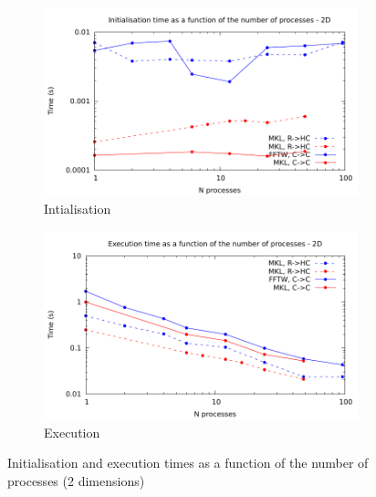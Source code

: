\documentclass[12pt, a4paper]{article}
\begin{document}
\begin{figure}[H]
\captionsetup{width=0.8\linewidth}
\centering
\begin{subfigure}{.5\textwidth}
\centering
\includegraphics[width=.9\linewidth]{graphs/mpi-init-2d.pdf}
\caption{Intialisation}
\label{2DMPII}
\end{subfigure}%
\begin{subfigure}{.5\textwidth}
\centering
\includegraphics[width=.9\linewidth]{graphs/mpi-exec-2d.pdf}
\caption{Execution}
\label{2DMPIE}
\end{subfigure}
\caption{Initialisation and execution times as a function of the number of processes (2 dimensions)}
\label{2DMPI}
\end{figure}
\end{document}
